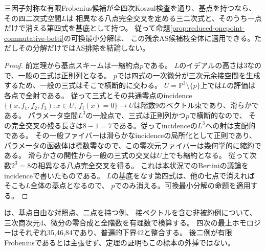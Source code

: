 \begin{corollary}[残る一点枝の縮約八点表示]\label{cor:simple-basepoint-reduced-net}
三因子対称な有限Frobenius候補が全四次Koszul検査を通り、基点を持つなら、その四二次式空間$L$は
相異なる八点完全交叉を定める三二次式と、そのうち一点だけで消える第四式を基底として持つ。
従って\textup{命題\ref{prop:reduced-onepoint-commutative-betti}}の可換最小分解は、
この残余AS候補枝全体に適用できる。ただしその分解だけではAS排除を結論しない。
\end{corollary}
\begin{proof}
前定理から基点スキームは一縮約点$p$である。
$L$のイデアルの高さは3なので、一般の三式は正則列となる。
$p$では四式の一次微分が三次元余接空間を生成するため、一般の三式はそこで横断的に交わる。
$U=\mathbb P^3\setminus\{p\}$上では$L$の評価は各点で全射である。
従って三式とその共通零点のincidence
$\{(x,f_1,f_2,f_3):x\in U,\ f_i(x)=0\}\to U$は階数9のベクトル束であり、滑らかである。
パラメータ空間$L^3$の一般点で、三式は正則列かつ$p$で横断的なので、
その完全交叉の残る長さは$8-1=7$である。従ってincidenceの$L^3$への射は支配的である。
その一般ファイバーは滑らかなincidenceの局所化として正則であり、
パラメータの函数体は標数零なので、この零次元ファイバーは幾何学的に縮約である。
滑らかさの開性から一般の三式の交叉は$U$上でも縮約となる。
従って次数$2^3=8$の相異なる八点完全交叉を得る。
これは本状況でのBertiniの議論をincidenceで書いたものである。
$L$の基底をなす第四式は、他の七点で消えればそこも$L$全体の基点となるので、
$p$でのみ消える。可換最小分解の命題を適用する。
\end{proof}

\begin{remark}
は、基点自由な対照点、二点を持つ例、
接ベクトルを含む非被約例について、三次商次元4、微分の零合成と全階数を有理数で検算する。
四次の最上ホモロジーはそれぞれ35,46,84であり、普遍的下界42と整合する。
後二例が有限Frobeniusであるとは主張せず、定理の証明もこの標本の外挿ではない。
\end{remark}
